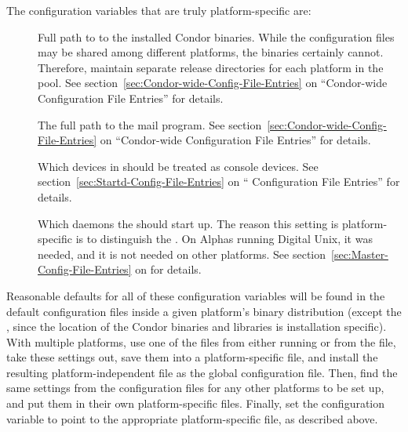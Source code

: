 The configuration variables that are truly platform-specific are:

\begin{description}

\item[] Full path to to the installed
  Condor binaries.  While the configuration files may be shared among
  different platforms, the binaries certainly cannot.  Therefore,
  maintain separate release directories for each platform
  in the pool.  See section~\ref{sec:Condor-wide-Config-File-Entries}
  on ``Condor-wide Configuration File Entries'' for details.

\item[] The full path to the mail program.  See
  section~\ref{sec:Condor-wide-Config-File-Entries} on ``Condor-wide
  Configuration File Entries'' for details.

\item[] Which devices in  should be
  treated as console devices.  See
  section~\ref{sec:Startd-Config-File-Entries} on ``
  Configuration File Entries'' for details.

\item[] Which daemons the  should
  start up.  The reason this setting is platform-specific is
  to distinguish the .
  On Alphas running Digital Unix, it was needed,
  and it is not needed on other platforms.
  See section~\ref{sec:Master-Config-File-Entries} on
  for details.

\end{description}

Reasonable defaults for all of these configuration variables
will be found in the
default configuration files inside a given platform's binary distribution
(except the , since 
the location of the Condor binaries and libraries is installation specific).
With multiple platforms,
use one of the  files from
either running  or from the
 file,
take these settings out,
save them into a platform-specific file,
and install the resulting platform-independent file as the global
configuration file.
Then,
find the same settings from the configuration files for any other platforms
to be set up, and put them in their own platform-specific files.
Finally, set the  configuration variable
to point to
the appropriate platform-specific file, as described above.

